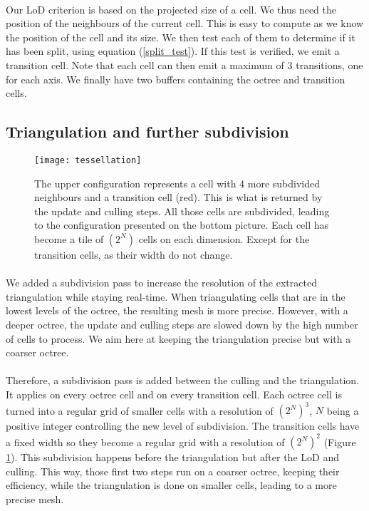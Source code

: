 \paragraph{}
Our LoD criterion is based on the projected size of a cell.
We thus need the position of the neighbours of the current cell.
This is easy to compute as we know the position of the cell and its size.
We then test each of them to determine if it has been split, using equation (\ref{split_test}).
If this test is verified, we emit a transition cell.
Note that each cell can then emit a maximum of 3 transitions, one for each axis.
We finally have two buffers containing the octree and transition cells.

\subsection{Triangulation and further subdivision}

\begin{figure}
  \centering
  \texttt{[image: tessellation]}
  \caption{The upper configuration represents a cell with 4 more subdivided neighbours and a transition cell (red).
  This is what is returned by the update and culling steps.
  All those cells are subdivided, leading to the configuration presented on the bottom picture.
  Each cell has become a tile of $(2^N)$ cells on each dimension.
  Except for the transition cells, as their width do not change. }
  \label{tessellation} 
\end{figure}

\paragraph{}
We added a subdivision pass to increase the resolution of the extracted triangulation while staying real-time. 
When triangulating cells that are in the lowest levels of the octree, the resulting mesh is more precise. 
However, with a deeper octree, the update and culling steps are slowed down by the high number of cells to process.
We aim here at keeping the triangulation precise but with a coarser octree.

\paragraph{}
Therefore, a subdivision pass is added between the culling and the triangulation. 
It applies on every octree cell and on every transition cell.
Each octree cell is turned into a regular grid of smaller cells with a resolution of $(2^N)^3$, $N$ being a positive integer controlling the new level of subdivision.
The transition cells have a fixed width so they become a regular grid with a resolution of $(2^N)^2$ (Figure \ref{tessellation}).
This subdivision happens before the triangulation but after the LoD and culling.
This way, those first two steps run on a coarser octree, keeping their efficiency, while the triangulation is done on smaller cells, leading to a more precise mesh.

